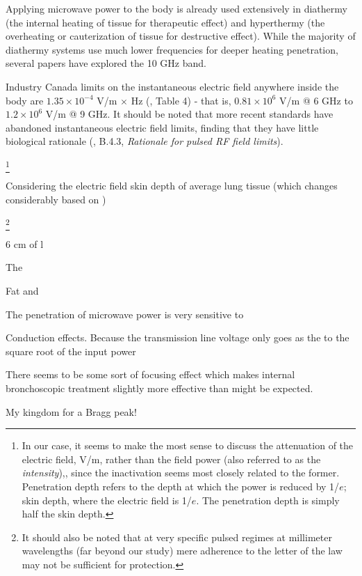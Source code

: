 \documentclass[paper.tex]{subfiles}
\begin{document}
Applying microwave power to the body is already used extensively in diathermy (the internal heating of tissue for therapeutic effect) and hyperthermy (the overheating or cauterization of tissue for destructive effect). While the majority of diathermy systems use much lower frequencies  for deeper heating penetration, several papers have explored the 10 GHz band. 

Industry Canada limits on the instantaneous electric field anywhere inside the body are $1.35 \times 10^{-4}$ V/m $\times$ Hz (\cite{RSS1022015}, Table 4) - that is, $0.81 \times 10^6$ V/m @ 6 GHz to $1.2 \times 10^6$ V/m @ 9 GHz. It should be noted that more recent standards have abandoned instantaneous electric field limits, finding that they have little biological rationale (\cite{C95}, B.4.3, {\it Rationale for pulsed RF field limits}).

\footnote{In our case, it seems to make the most sense to discuss the attenuation of the electric field, V/m, rather than the field power (also referred to as the {\it intensity}),\Wsqm, since the inactivation seems most closely related to the former. Penetration depth refers to the depth at which the power is reduced by 1/$e$; skin depth, where the electric field is 1/$e$. The penetration depth is simply half the skin depth.\cite{Penetration2019a}}

Considering the electric field skin depth of average lung tissue\cite{gabriel1996compilation} (which changes considerably based on )

\footnote{It should also be noted that at very specific pulsed regimes at millimeter wavelengths (far beyond our study) mere adherence to the letter of the law may not be sufficient for protection\cite{Limitations}.}



6 cm of l

The 

Fat and 

The penetration of microwave power is very sensitive to 

Conduction effects. Because the transmission line voltage only goes as the to the square root of the input power

There seems to be some sort of focusing effect which makes internal bronchoscopic treatment slightly more effective than might be expected.




My kingdom for a Bragg peak!

\clearpage
\printbibliography[heading=none, title={}, keyword={Flagship}]
\printbibliography[heading=none, title={}, keyword={standards}]
\end{document}
